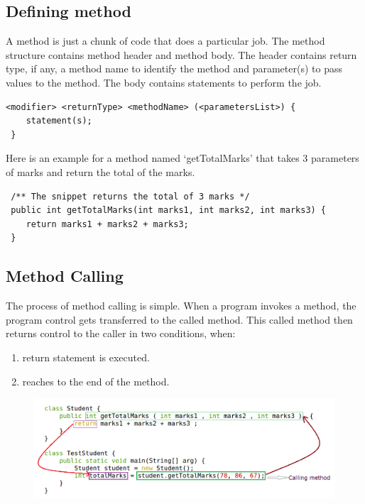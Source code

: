 \documentclass[11pt,a4paper]{article}
\begin{document}
\subsection*{Defining method} 
A method is just a chunk of code that does a particular job. The method structure contains method header and method body. The header contains return type, if any, a method name to identify the method and parameter(s) to pass values to the method. The body contains statements to perform the job.

\begin{lstlisting}[numbers=none]
 <modifier> <returnType> <methodName> (<parametersList>) {
    statement(s);
 }
\end{lstlisting}
Here is an example for a method named `getTotalMarks' that takes 3 parameters of marks and return the total of the marks.
\begin{lstlisting}
 /** The snippet returns the total of 3 marks */
 public int getTotalMarks(int marks1, int marks2, int marks3) {
    return marks1 + marks2 + marks3; 
 }
\end{lstlisting}

\subsection*{Method Calling}

The process of method calling is simple. When a program invokes a method, the program control gets transferred to the called method. This called method then returns control to the caller in two conditions, when:

\begin{enumerate}
 \item return statement is executed.
 \item reaches to the end of the method.
\end{enumerate}
 \begin{figure}[H] 
 \begin{center}
  \includegraphics[scale=.45]{method-call.png}
\end{center}
 \end{figure}
\end{document}
